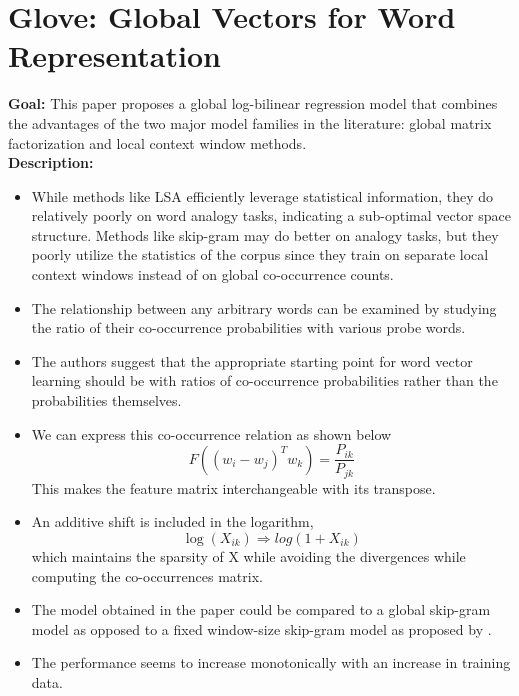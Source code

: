\documentclass[11pt,a4paper]{article}
\begin{document}


\section{Glove: Global Vectors for Word Representation} %
\label{sec:glove_global_vectors_for_word_representation}

  \textbf{Goal:}
  This paper proposes a global log-bilinear regression model that combines the advantages of the two major model families in the literature: global matrix factorization and local context window methods\cite{pennington2014glove}.\\

  \textbf{Description:}
  \begin{itemize}
    \item
    While methods like LSA efficiently leverage statistical information, they do relatively poorly on word analogy tasks, indicating a sub-optimal vector space structure. Methods like skip-gram may do better on analogy tasks, but they poorly utilize the statistics of the corpus since they train on separate local context windows instead of on global co-occurrence counts.
    \item
    The relationship between any arbitrary words can be examined by studying the ratio of their co-occurrence probabilities with various probe words.
    \item
    The authors suggest that the appropriate starting point for word vector learning should be with ratios of co-occurrence probabilities rather than the probabilities themselves.
    \item
    We can express this co-occurrence relation as shown below
    $$F((w_i - w_j)^T w_k) = \frac{P_{ik}}{P_{jk}}$$
    This makes the feature matrix interchangeable with its transpose.
    \item
    An additive shift is included in the logarithm, $$\log(X_{ik}) \Rightarrow log(1 + X_{ik})$$ which maintains the sparsity of X while avoiding the divergences while computing the co-occurrences matrix.
    \item 
    The model obtained in the paper could be compared to a global skip-gram model as opposed to a fixed window-size skip-gram model as proposed by \cite{mikolov2013efficient}.
    \item 
    The performance seems to increase monotonically with an increase in training data.
  \end{itemize}
\end{document}
